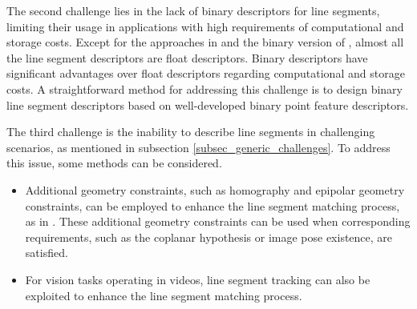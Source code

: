 \documentclass[journal,compsoc]{IEEEtran}
\begin{document}
The second challenge lies in the lack of binary descriptors for line segments, limiting their usage in applications with high requirements of computational and storage costs. Except for the approaches in \cite{Abinaryrobustlinedescriptor,IILB} and the binary version of \cite{LBD}, almost all the line segment descriptors are float descriptors. Binary descriptors have significant advantages over float descriptors regarding computational and storage costs. A straightforward method for addressing this challenge is to design binary line segment descriptors based on well-developed binary point feature descriptors.

The third challenge is the inability to describe line segments in challenging scenarios, as mentioned in subsection \ref{subsec_generic_challenges}. To address this issue, some methods can be considered.
\begin{itemize}
	\item Additional geometry constraints, such as homography and epipolar geometry constraints, can be employed to enhance the line segment matching process, as in \cite{Automaticlinematchingacrossviews,MatchingDisparateViewsofPlanarSurfacesusingProjectiveInvariants,Thegeometryandmatchingoflinesandcurvesovermultipleviews,Anovellinematchingmethodbasedonintersectioncontext,Simultaneouslinematchingandepipolargeometryestimationbasedontheintersectioncontextofcoplanarlinepairs,LineMatchinginWideBaselineStereoATopDownApproach,Widebaselinestereomatchingbasedonthelineintersectioncontextforrealtimeworkspacemodeling,RobustLineMatchingBasedonRay-Point-RayStructureDescriptor,NovelCoplanarLinePointsInvariantsforRobustLineMatchingAcrossViews,HierarchicalLineMatchingBasedonLineJunctionLineStructureDescriptorandLocalHomographyEstimation,Linesegmentmatchingandreconstructionviaexploitingcoplanarcues,MultimodalImageRegistrationWithLineSegmentsbySelectiveSearch,Robustlinesegmentmatchingviareweightedrandomwalksonthehomographygraph}. These additional geometry constraints can be used when corresponding requirements, such as the coplanar hypothesis or image pose existence, are satisfied.
		
	\item For vision tasks operating in videos, line segment tracking \cite{Trackinglinesegments,GeometricbasedLineSegmentTrackingforHDRStereoSequences,LOF,LineFlowBasedSimultaneousLocalizationandMapping,HighlyEfficientLineSegmentTrackingwithanIMUKLTPredictionandaConvexGeometricDistanceMinimization,SparseOpticalFlow-BasedLineFeatureTracking} can also be exploited to enhance the line segment matching process.
		

\end{itemize}
\end{document}
